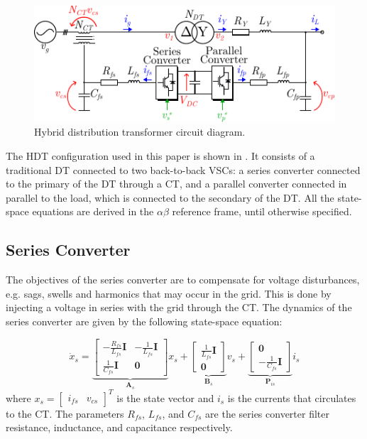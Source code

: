 \begin{figure}[t!]
    \centering
    \includegraphics[width=\columnwidth]{Images/HDT_Diagram.pdf} 
    \caption{Hybrid distribution transformer circuit diagram.}
    \label{fig:HDT_Transformer}
\end{figure}

The HDT configuration used in this paper is shown in . It consists of a traditional DT connected to two back-to-back VSCs: a series converter connected to the primary of the DT through a CT, and a parallel converter connected in parallel to the load, which is connected to the secondary of the DT. All the state-space equations are derived in the $\alpha\beta$ reference frame, until otherwise specified.

\subsection{Series Converter}
The objectives of the series converter are to compensate for voltage disturbances, e.g. sags, swells and harmonics that may occur in the grid. This is done by injecting a voltage in series with the grid through the CT. The dynamics of the series converter are given by the following state-space equation:

\begin{equation}
    \dot{x}_s =
    \underbrace{
    \begin{bmatrix}
        -\frac{R_{fs}}{L_{fs}} \mathbf{I} & -\frac{1}{L_{fs}} \mathbf{I} \\
        \frac{1}{C_{fs}} \mathbf{I} & \mathbf{0}
    \end{bmatrix}
    }_{\mathbf{A}_s}
    x_s +
    \underbrace{
    \begin{bmatrix}
        \frac{1}{L_{fs}}\mathbf{I}\\
        \mathbf{0}
    \end{bmatrix}
    }_{\mathbf{B}_s}
    v_s +
    \underbrace{
    \begin{bmatrix}
        \mathbf{0} \\
        -\frac{1}{C_{fs}}\mathbf{I}
    \end{bmatrix}
    }_{\mathbf{P}_{is}}
    i_s \label{eq:SeriesConverter_Dynamics}
\end{equation}
where $x_s = \begin{bmatrix} i_{fs} & v_{cs} \end{bmatrix}^T$ is the state vector and $i_s$ is the currents that circulates to the CT. The parameters $R_{fs}$, $L_{fs}$, and $C_{fs}$ are the series converter filter resistance, inductance, and capacitance respectively.

